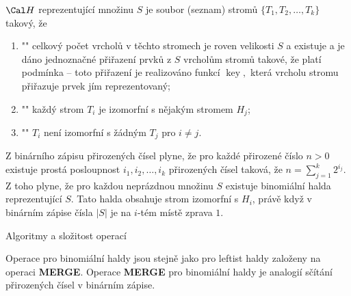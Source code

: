 \documentclass[a4paper,12pt]{article}
\def \emph#1{\underbar{#1}}
\DeclareMathOperator*{\key}{key}
\begin{document}
\emph{Binomiální} \emph{halda} $\Cal H$ reprezentující 
množinu $S$ je soubor (seznam) stromů $\{T_1,T_2,\dots
,T_k\}$ 
takový, že 
\begin{enumerate}
\item"{}"
celkový počet vrcholů v těchto stromech je 
roven velikosti $S$ a 
existuje a je dáno jednoznačné přiřazení prvků 
z $S$ vrcholům stromů takové, že platí 
podmínka  -- toto přiřazení je realizováno 
funkcí 
$\key,$ která vrcholu stromu přiřazuje prvek jím reprezentovaný;
\item"{}"
každý strom $T_i$ je izomorfní s nějakým stromem $H_
j$;
\item"{}"
$T_i$ není izomorfní s žádným $T_j$ pro $i\ne j$.
\end{enumerate}

Z binárního zápisu přirozených čísel plyne, že 
pro každé přiro\-ze\-né číslo $n>0$ existuje prostá 
posloupnost $i_1,i_2,\dots,i_k$ přiro\-ze\-ných čísel taková, že 
$n=\sum_{j=1}^k2^{i_j}$. Z toho plyne, že pro každou neprázd\-nou 
množinu $S$ existuje binomiální halda repre\-zentující $
S$.
Tato halda obsahuje strom izomorfní s $H_i$, právě když v 
binárním zápise čísla $|S|$ je na $i$-tém místě zprava $
1$.

\head
Algoritmy a složitost operací
\endhead

Operace pro binomiální haldy jsou  
stejně jako pro leftist haldy založeny na ope\-raci {\bf MER\-GE}. Ope\-race 
{\bf MERGE} pro binomiální haldy je analogií sčítání 
přirozených čísel v binár\-ním zápise.
\end{document}
